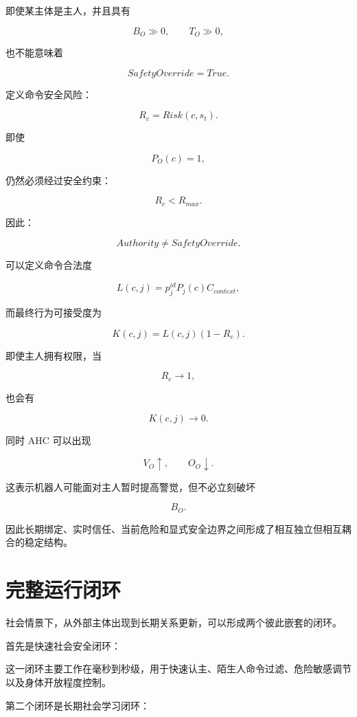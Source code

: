 即使某主体是主人，并且具有

\[
B_O\gg0,
\qquad
T_O\gg0,
\]

也不能意味着

\[
SafetyOverride=True.
\]

定义命令安全风险：

\[
R_c
=
Risk(c,s_t).
\]

即使

\[
P_O(c)=1,
\]

仍然必须经过安全约束：

\[
R_c<R_{max}.
\]

因此：

\[
\boxed{
Authority
\neq
SafetyOverride.
}
\]

可以定义命令合法度

\[
L(c,j)
=
p_j^{id}
P_j(c)
C_{context},
\]

而最终行为可接受度为

\[
K(c,j)
=
L(c,j)
(1-R_c).
\]

即使主人拥有权限，当

\[
R_c\rightarrow1,
\]

也会有

\[
K(c,j)\rightarrow0.
\]

同时 AHC 可以出现

\[
V_O\uparrow,
\qquad
O_O\downarrow.
\]

这表示机器人可能面对主人暂时提高警觉，但不必立刻破坏

\[
B_O.
\]

因此长期绑定、实时信任、当前危险和显式安全边界之间形成了相互独立但相互耦合的稳定结构。


\section{完整运行闭环}

社会情景下，从外部主体出现到长期关系更新，可以形成两个彼此嵌套的闭环。

首先是快速社会安全闭环：

\begin{statementbox}
\centering
{}
\end{statementbox}

这一闭环主要工作在毫秒到秒级，用于快速认主、陌生人命令过滤、危险敏感调节以及身体开放程度控制。

第二个闭环是长期社会学习闭环：

